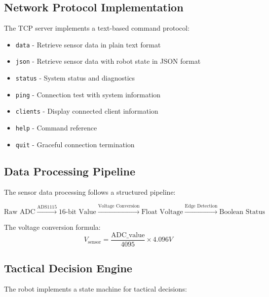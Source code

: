 \documentclass[12pt,a4paper]{article}
\begin{document}
\subsection{Network Protocol Implementation}

The TCP server implements a text-based command protocol:

\begin{tcolorbox}[colback=cyan!5!white,colframe=cyan!75!black,title=TCP Command Set]
\begin{itemize}
    \item \texttt{data} - Retrieve sensor data in plain text format
    \item \texttt{json} - Retrieve sensor data with robot state in JSON format
    \item \texttt{status} - System status and diagnostics
    \item \texttt{ping} - Connection test with system information
    \item \texttt{clients} - Display connected client information
    \item \texttt{help} - Command reference
    \item \texttt{quit} - Graceful connection termination
\end{itemize}
\end{tcolorbox}

\subsection{Data Processing Pipeline}

The sensor data processing follows a structured pipeline:

\begin{equation}
\text{Raw ADC} \xrightarrow{\text{ADS1115}} \text{16-bit Value} \xrightarrow{\text{Voltage Conversion}} \text{Float Voltage} \xrightarrow{\text{Edge Detection}} \text{Boolean Status}
\end{equation}

The voltage conversion formula:
\begin{equation}
V_{\text{sensor}} = \frac{\text{ADC\_value}}{4095} \times 4.096V
\end{equation}

\subsection{Tactical Decision Engine}

The robot implements a state machine for tactical decisions:
\end{document}
